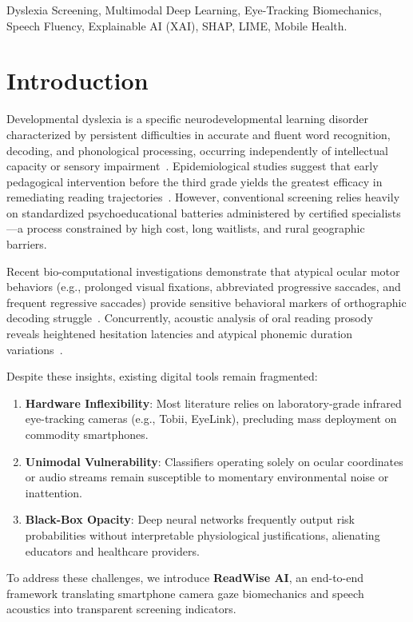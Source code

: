 \documentclass[conference]{IEEEtran}
\begin{document}
\begin{IEEEkeywords}
Dyslexia Screening, Multimodal Deep Learning, Eye-Tracking Biomechanics, Speech Fluency, Explainable AI (XAI), SHAP, LIME, Mobile Health.
\end{IEEEkeywords}

\section{Introduction}
Developmental dyslexia is a specific neurodevelopmental learning disorder characterized by persistent difficulties in accurate and fluent word recognition, decoding, and phonological processing, occurring independently of intellectual capacity or sensory impairment~\cite{who2019}. Epidemiological studies suggest that early pedagogical intervention before the third grade yields the greatest efficacy in remediating reading trajectories~\cite{shaywitz1990}. However, conventional screening relies heavily on standardized psychoeducational batteries administered by certified specialists---a process constrained by high cost, long waitlists, and rural geographic barriers.

Recent bio-computational investigations demonstrate that atypical ocular motor behaviors (e.g., prolonged visual fixations, abbreviated progressive saccades, and frequent regressive saccades) provide sensitive behavioral markers of orthographic decoding struggle~\cite{rayner1998}. Concurrently, acoustic analysis of oral reading prosody reveals heightened hesitation latencies and atypical phonemic duration variations~\cite{rello2015}. 

Despite these insights, existing digital tools remain fragmented:
\begin{enumerate}
    \item \textbf{Hardware Inflexibility}: Most literature relies on laboratory-grade infrared eye-tracking cameras (e.g., Tobii, EyeLink), precluding mass deployment on commodity smartphones.
    \item \textbf{Unimodal Vulnerability}: Classifiers operating solely on ocular coordinates or audio streams remain susceptible to momentary environmental noise or inattention.
    \item \textbf{Black-Box Opacity}: Deep neural networks frequently output risk probabilities without interpretable physiological justifications, alienating educators and healthcare providers.
\end{enumerate}

To address these challenges, we introduce \textbf{ReadWise AI}, an end-to-end framework translating smartphone camera gaze biomechanics and speech acoustics into transparent screening indicators.
\end{document}
